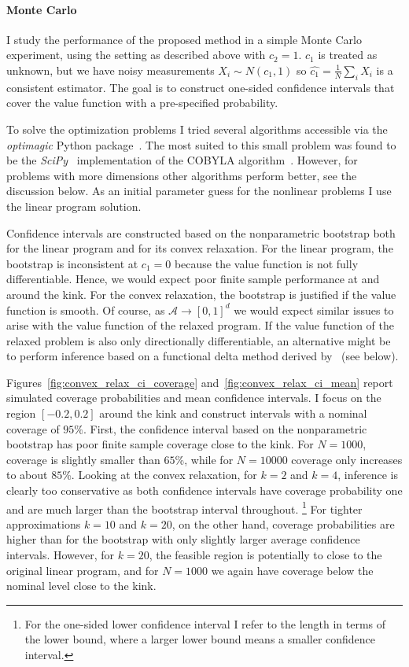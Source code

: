 \documentclass[12pt,a4paper,english]{article} %
\numberwithin{equation}{section}
\theoremstyle{definition}
\theoremstyle{remark}
\theoremstyle{plain}
\begin{document}
\paragraph{Monte Carlo}
I study the performance of the proposed method in a simple Monte Carlo experiment, using the setting as described above with $c_2=1$.
$c_1$ is treated as unknown, but we have noisy measurements $X_i \sim N(c_1, 1)$ so $\hat{c_1} = \frac{1}{N}\sum_i X_i$ is a consistent estimator.
The goal is to construct one-sided confidence intervals that cover the value function with a pre-specified probability.

To solve the optimization problems I tried several algorithms accessible via the \textit{optimagic} Python package~\citep{Gabler2024}.
The most suited to this small problem was found to be the \textit{SciPy}~\citep{scipy} implementation of the COBYLA algorithm~\citep{cobyla_powell1994direct}.
However, for problems with more dimensions other algorithms perform better, see the discussion below.
As an initial parameter guess for the nonlinear problems I use the linear program solution.

Confidence intervals are constructed based on the nonparametric bootstrap both for the linear program and for its convex relaxation.
For the linear program, the bootstrap is inconsistent at $c_1=0$ because the value function is not fully differentiable.
Hence, we would expect poor finite sample performance at and around the kink.
For the convex relaxation, the bootstrap is justified if the value function is smooth.
Of course, as $\mathcal{A}\to [0,1]^d$ we would expect similar issues to arise with the value function of the relaxed program.
If the value function of the relaxed problem is also only directionally differentiable, an alternative might be to perform inference based on a functional delta method derived by~\cite{shapiro1991asymptotic} (see below).

Figures~\ref{fig:convex_relax_ci_coverage} and~\ref{fig:convex_relax_ci_mean} report simulated coverage probabilities and mean confidence intervals.
I focus on the region $[-0.2, 0.2]$ around the kink and construct intervals with a nominal coverage of $95\%$.
First, the confidence interval based on the nonparametric bootstrap has poor finite sample coverage close to the kink. For $N=1000$, coverage is slightly smaller than $65$\%, while for $N=10000$ coverage only increases to about $85$\%.
Looking at the convex relaxation, for $k=2$ and $k=4$, inference is clearly too conservative as both confidence intervals have coverage probability one and are much larger than the bootstrap interval throughout.
\footnote{For the one-sided lower confidence interval I refer to the length in terms of the lower bound, where a larger lower bound means a smaller confidence interval.}
For tighter approximations $k=10$ and $k=20$, on the other hand, coverage probabilities are higher than for the bootstrap with only slightly larger average confidence intervals.
However, for $k=20$, the feasible region is potentially to close to the original linear program, and for $N=1000$ we again have coverage below the nominal level close to the kink.
\end{document}
